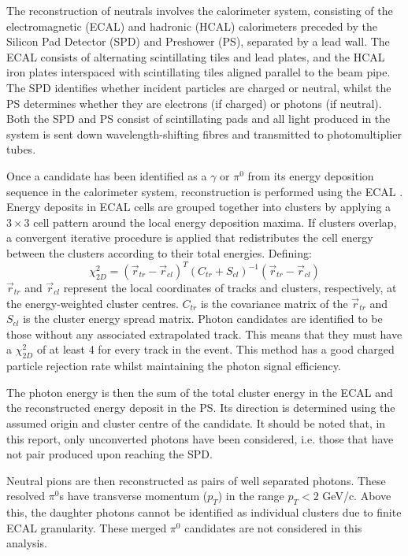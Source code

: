 \documentclass[oneside,12pt]{article}
\begin{document}
The reconstruction of neutrals involves the calorimeter system, consisting of
the electromagnetic (ECAL) and hadronic (HCAL) calorimeters preceded by the
Silicon Pad Detector (SPD) and Preshower (PS), separated by a lead wall. The
ECAL consists of alternating scintillating tiles and lead plates, and the HCAL
iron plates interspaced with scintillating tiles aligned parallel to the beam
pipe. The SPD identifies whether incident particles are charged or neutral,
whilst the PS determines whether they are electrons (if charged) or photons (if
neutral). Both the SPD and PS consist of scintillating pads and all light
produced in the system is sent down wavelength-shifting fibres and transmitted
to photomultiplier tubes.

Once a candidate has been identified as a $\gamma$ or $\pi^0$ from its energy
deposition sequence in the calorimeter system, reconstruction is performed using
the ECAL \cite{NeutralReconstruction}. Energy deposits in ECAL cells are grouped
together into clusters by applying a $3\times3$ cell pattern around the local
energy deposition maxima. If clusters overlap, a convergent iterative procedure
is applied that redistributes the cell energy between the clusters according to
their total energies.  Defining: 
\begin{equation}
  \chi^2_{2D}=(\vec{r}_{tr}-\vec{r}_{cl})^T(C_{tr}+S_{cl})^{-1}(\vec{r}_{tr}-\vec{r}_{cl})
  \label{Chi2}
\end{equation}
$\vec{r}_{tr}$ and $\vec{r}_{cl}$ represent the local coordinates of tracks and
clusters, respectively, at the energy-weighted cluster centres. $C_{tr}$ is the
covariance matrix of the $\vec{r}_{tr}$ and $S_{cl}$ is the cluster energy
spread matrix. Photon candidates are identified to be those without any
associated extrapolated track. This means that they must have a $\chi^2_{2D}$ of
at least 4 for every track in the event. This method has a good charged particle
rejection rate whilst maintaining the photon signal efficiency.

The photon energy is then the sum of the total cluster energy in the ECAL and
the reconstructed energy deposit in the PS. Its direction is determined using
the assumed origin and cluster centre of the candidate. It should be noted that,
in this report, only unconverted photons have been considered, i.e. those that
have not pair produced upon reaching the SPD.

Neutral pions are then reconstructed as pairs of well separated photons. These
resolved $\pi^0$s have transverse momentum ($p_T$) in the range $p_{T}<2$ GeV/c.
Above this, the daughter photons cannot be identified as individual clusters due
to finite ECAL granularity. These merged $\pi^0$ candidates are not considered
in this analysis.
\end{document}
